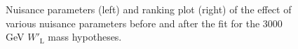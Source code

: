 \begin{figure}[H]
  \centering
  \caption{Nuisance parameters (left) and ranking plot (right) of the effect of various nuisance parameters before and after the fit for the 3000 GeV $W'_{\text{L}}$ mass hypotheses.}
  \label{fig:NuisParAndRanking_WpLH3000}
\end{figure}
